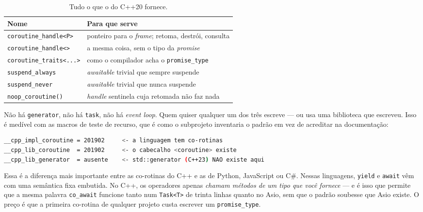 \begin{table}[htbp]
\centering
\caption{Tudo o que o  do C++20 fornece.}
\label{tab:coroutine-header}
\footnotesize
\begin{tabular}{@{}ll@{}}
\toprule
\textbf{Nome} & \textbf{Para que serve} \\
\midrule
\texttt{coroutine\_handle<P>}   & ponteiro para o \emph{frame}; retoma, destrói, consulta \\
\texttt{coroutine\_handle<>}    & a mesma coisa, sem o tipo da \emph{promise} \\
\texttt{coroutine\_traits<...>} & como o compilador acha o \texttt{promise\_type} \\
\texttt{suspend\_always}        & \emph{awaitable} trivial que sempre suspende \\
\texttt{suspend\_never}         & \emph{awaitable} trivial que nunca suspende \\
\texttt{noop\_coroutine()}      & \emph{handle} sentinela cuja retomada não faz nada \\
\bottomrule
\end{tabular}
\end{table}

Não há \texttt{generator}, não há \texttt{task}, não há \emph{event loop}. Quem
quiser qualquer um dos três escreve --- ou usa uma biblioteca que escreveu.
Isso é medível com as macros de teste de recurso, que é como o subprojeto
 inventaria o padrão em vez de acreditar na documentação:

\begin{lstlisting}[style=bt, language=bash,
    caption={Medição no GCC 13.3 (o compilador deste livro), com
             \texttt{-std=c++23}: o mecanismo está lá, o tipo pronto não.}]
__cpp_impl_coroutine = 201902     <- a linguagem tem co-rotinas
__cpp_lib_coroutine  = 201902     <- o cabecalho <coroutine> existe
__cpp_lib_generator  = ausente    <- std::generator (C++23) NAO existe aqui
\end{lstlisting}

\begin{regra}
Essa é a diferença mais importante entre as co-rotinas do C++ e as de Python,
JavaScript ou C\#. Nessas linguagens, \texttt{yield} e \texttt{await} vêm com
uma semântica fixa embutida. No C++, os operadores apenas \emph{chamam métodos
de um tipo que você fornece} --- e é isso que permite que a mesma palavra
\texttt{co\_await} funcione tanto num \texttt{Task<T>} de trinta linhas quanto
no Asio, sem que o padrão soubesse que Asio existe. O preço é que a primeira
co-rotina de qualquer projeto custa escrever um \texttt{promise\_type}.
\end{regra}

